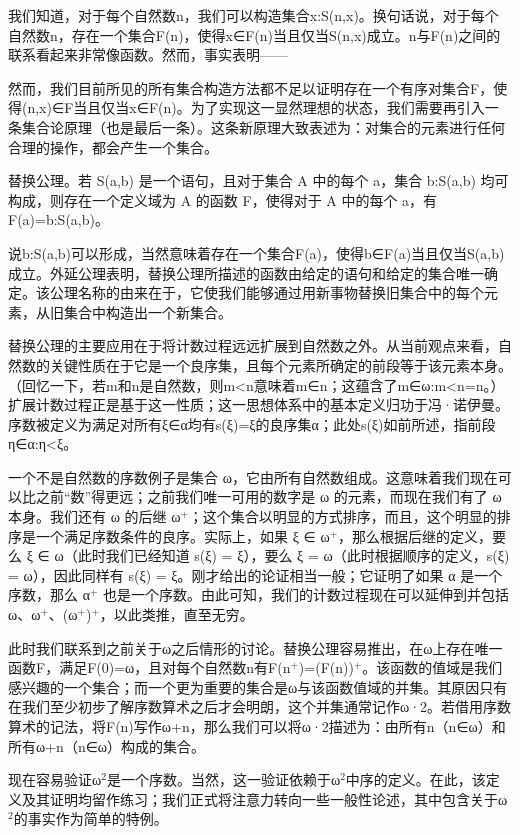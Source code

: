 \documentclass[12pt,a4paper]{ctexbook}
\theoremstyle{definition}
\theoremstyle{remark}
\begin{document}
{我们知道，对于每个自然数n，我们可以构造集合{x:S(n,x)}。换句话说，对于每个自然数n，存在一个集合F(n)，使得x∈F(n)当且仅当S(n,x)成立。n与F(n)之间的联系看起来非常像函数。然而，事实表明——

然而，我们目前所见的所有集合构造方法都不足以证明存在一个有序对集合F，使得(n,x)∈F当且仅当x∈F(n)。为了实现这一显然理想的状态，我们需要再引入一条集合论原理（也是最后一条）。这条新原理大致表述为：对集合的元素进行任何合理的操作，都会产生一个集合。

替换公理。若 S(a,b) 是一个语句，且对于集合 A 中的每个 a，集合 {b:S(a,b)} 均可构成，则存在一个定义域为 A 的函数 F，使得对于 A 中的每个 a，有 F(a)={b:S(a,b)}。

说{b:S(a,b)}可以形成，当然意味着存在一个集合F(a)，使得b∈F(a)当且仅当S(a,b)成立。外延公理表明，替换公理所描述的函数由给定的语句和给定的集合唯一确定。该公理名称的由来在于，它使我们能够通过用新事物替换旧集合中的每个元素，从旧集合中构造出一个新集合。

替换公理的主要应用在于将计数过程远远扩展到自然数之外。从当前观点来看，自然数的关键性质在于它是一个良序集，且每个元素所确定的前段等于该元素本身。（回忆一下，若m和n是自然数，则m<n意味着m∈n；这蕴含了{m∈ω:m<n}=n。）扩展计数过程正是基于这一性质；这一思想体系中的基本定义归功于冯·诺伊曼。序数被定义为满足对所有ξ∈α均有s(ξ)=ξ的良序集α；此处s(ξ)如前所述，指前段{η∈α:η<ξ}。

一个不是自然数的序数例子是集合 ω，它由所有自然数组成。这意味着我们现在可以比之前“数”得更远；之前我们唯一可用的数字是 ω 的元素，而现在我们有了 ω 本身。我们还有 ω 的后继 ω$^{+}$；这个集合以明显的方式排序，而且，这个明显的排序是一个满足序数条件的良序。实际上，如果 ξ ∈ ω$^{+}$，那么根据后继的定义，要么 ξ ∈ ω（此时我们已经知道 s(ξ) = ξ），要么 ξ = ω（此时根据顺序的定义，s(ξ) = ω），因此同样有 s(ξ) = ξ。刚才给出的论证相当一般；它证明了如果 α 是一个序数，那么 α$^{+}$ 也是一个序数。由此可知，我们的计数过程现在可以延伸到并包括 ω、ω$^{+}$、(ω$^{+}$)$^{+}$，以此类推，直至无穷。

此时我们联系到之前关于ω之后情形的讨论。替换公理容易推出，在ω上存在唯一函数F，满足F(0)=ω，且对每个自然数n有F(n$^{+}$)=(F(n))$^{+}$。该函数的值域是我们感兴趣的一个集合；而一个更为重要的集合是ω与该函数值域的并集。其原因只有在我们至少初步了解序数算术之后才会明朗，这个并集通常记作ω·2。若借用序数算术的记法，将F(n)写作ω+n，那么我们可以将ω·2描述为：由所有n（n∈ω）和所有ω+n（n∈ω）构成的集合。

现在容易验证ω$^{2}$是一个序数。当然，这一验证依赖于ω$^{2}$中序的定义。在此，该定义及其证明均留作练习；我们正式将注意力转向一些一般性论述，其中包含关于ω$^{2}$的事实作为简单的特例。

}
\end{document}
